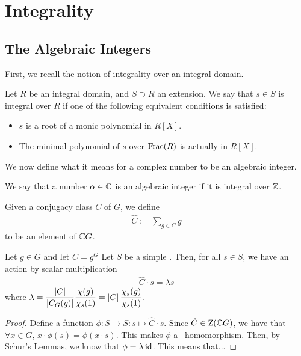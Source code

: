 \section{Integrality}

\subsection{The Algebraic Integers}

First, we recall the notion of integrality over an integral domain.

\begin{boxdefinition}[Integrality]
    Let $R$ be an integral domain, and $S \supset R$ an extension. We say that $s \in S$ is integral over $R$ if one of the following equivalent conditions is satisfied:
    \begin{itemize}
        \item $s$ is a root of a monic polynomial in $R[X]$.
        \item The minimal polynomial of $s$ over $\operatorname{Frac}\!\left( R \right)$ is actually in $R[X]$.
    \end{itemize}
\end{boxdefinition}
We now define what it means for a complex number to be an algebraic integer.
\begin{boxdefinition}
    We say that a number $\alpha \in \mathbb{C}$ is an algebraic integer if it is integral over $\mathbb{Z}$.
\end{boxdefinition}

\begin{boxnotation}
    Given a conjugacy class $C$ of $G$, we define
    \begin{align}
        \hat{C} := \sum_{g \in C} g
    \end{align}
    to be an element of $\mathbb{C} G$.
\end{boxnotation}

\begin{lemma}
    Let $g \in G$ and let $C = g^G$ %
    Let $S$ be a simple \CGM. Then, for all $s \in S$, we have an action by scalar multiplication
    \begin{align*}
        \hat{C} \cdot s = \lambda s
    \end{align*}
    where $\displaystyle \lambda = \frac{\left\lvert C \right\rvert}{\left\lvert C_G(g) \right\rvert} \frac{\chi(g)}{\chi_s(1)} = \left\lvert C \right\rvert \frac{\chi_s(g)}{\chi_s(1)}$.
\end{lemma}
\begin{proof}
    Define a function $\phi : S \to S : s \mapsto \hat{C} \cdot s$. Since $\hat{C} \in \operatorname{Z}\!\left( \mathbb{C} G \right)$, %
    we have that $\forall x \in G$, $x \cdot \phi(s) = \phi(x \cdot s)$. This makes $\phi$ a \CGM\ homomorphism. Then, by Schur's Lemmas, we know that $\phi = \lambda \operatorname{id}$. This means that... %
\end{proof}

